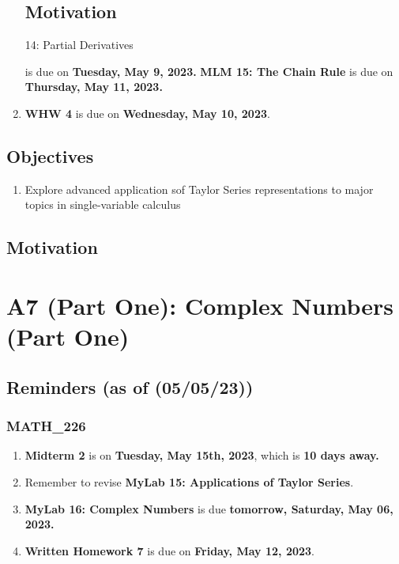 \begin{enumerate}
{\begin{enumerate}
\end{enumerate}

\section{Motivation}14: Partial Derivatives} is due on
        \textbf{Tuesday, May 9, 2023.}
        \textbf \textbf{MLM 15: The Chain Rule} is due on
        \textbf{Thursday, May 11, 2023.}
  \item \textbf{WHW 4} is due on \textbf{Wednesday,
        May 10, 2023}.

\end{enumerate}

\section{Objectives}
\begin{enumerate}
  \item Explore advanced application sof Taylor
        Series representations to major topics in
        single-variable calculus
\end{enumerate}

\section{Motivation}
\chapter{A7 (Part One): Complex Numbers (Part One)}
\section{Reminders (as of (05/05/23))}
\subsection{MATH\_226}
\begin{enumerate}
  \item  \textbf{Midterm 2} is on \textbf{Tuesday, May 15th, 2023}, which is \textbf{10 days away.}
  \item Remember to revise \textbf{MyLab 15:
        Applications of Taylor Series}.
  \item \textbf{MyLab 16: Complex Numbers} is
        due \textbf{tomorrow, Saturday, May 06, 2023.}
  \item \textbf{Written Homework 7} is due on
        \textbf{Friday, May 12, 2023}.
\end{enumerate}
